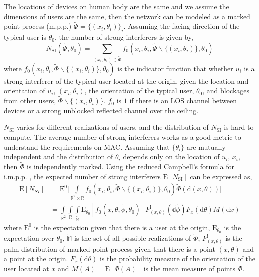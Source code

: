 \documentclass[10pt, conference, letterpaper]{IEEEtran}
\begin{document}
The locations of devices on human body are the same and we assume the dimensions of users are the same, then the network can be modeled as a marked point process (m.p.p.) $\tilde{\Phi}=\{(x_i, \theta_i)\}_i$. Assuming the facing direction of the typical user is $\theta_0$, the number of strong interferers is given by,
\begin{equation}
N_{\mathrm{SI}}(\tilde{\Phi}, \theta_0) = \sum_{(x_i, \theta_i)\in \tilde{\Phi}}f_0(x_i, \theta_i, \tilde{\Phi}\backslash\{(x_i,\theta_i)\}, \theta_0)
\end{equation}
where $f_0(x_i, \theta_i, \tilde{\Phi}\backslash\{(x_i,\theta_i)\}, \theta_0)$ is the indicator function that whether $u_i$ is a strong interferer of the typical user located at the origin, given the location and orientation of $u_i$, $(x_i, \theta_i)$, the orientation of the typical user, $\theta_0$, and blockages from other users, $\tilde{\Phi}\backslash\{(x_i,\theta_i)\}$. $f_0$ is $1$ if there is an LOS channel between devices or a strong unblocked reflected channel over the ceiling.

$N_{\mathrm{SI}}$ varies for different realizations of users, and the distribution of $N_{\mathrm{SI}}$ is hard to compute. The average number of strong interferers works as a good metric to understand the requirements on MAC. Assuming that $\{\theta_i\}$ are mutually independent and the distribution of $\theta_i$ depends only on the location of $u_i$, $x_i$, then $\tilde{\Phi}$ is independently marked\cite{stochasticgeometry}. Using the reduced Campbell's formula for i.m.p.p. \cite{stochasticgeometry}, the expected number of strong interferers $\mathrm{E}[N_{\mathrm{SI}}]$ can be expressed as, 
\begin{equation} \label{eq:N_SI}
\begin{split}
\mathrm{E}[N_{SI}] &= \mathrm{E}^0\bigg[\int\limits_{\mathbb{R}^2\times\mathbb{R}}f_0(x_i, \theta_i, \tilde{\Phi}\backslash\{(x_i,\theta_i)\}, \theta_0)\tilde{\Phi}(\mathrm{d}(x,\theta)) \bigg]\\
&= \int\limits_{\mathbb{R}^2}\int\limits_{\mathbb{R}}\int\limits_{\mathbb{\tilde{M}}}\mathrm{E}_{\theta_0}[f_0(x,\theta,\tilde{\phi}, \theta_0)]P_{(x,\theta)}^{!}(\mathbb{d}\tilde{\phi})F_x(\mathrm{d}\theta)M(\mathrm{d}x)
\end{split}
\end{equation}
where $\mathrm{E}^0$ is the expectation given that there is a user at the origin, $\mathrm{E}_{\theta_0}$ is the expectation over $\theta_0$, $\mathbb{\tilde{M}}$ is the set of all possible realizations of $\tilde{\Phi}$, $P_{(x,\theta)}^!$ is the palm distribution of marked point process given that there is a point $(x, \theta)$ and a point at the origin. $F_x(\mathrm{d}\theta)$ is the probability measure of the orientation of the user located at $x$ and $M(A)=\mathrm{E}[\Phi(A)]$ is the mean measure of points $\Phi$.
\end{document}
